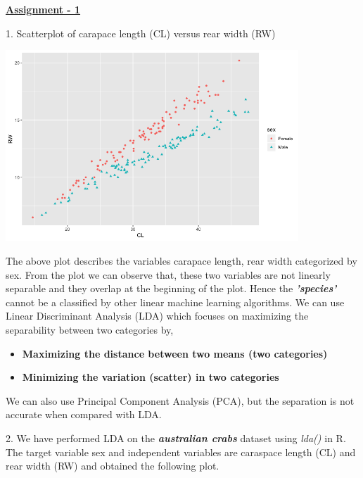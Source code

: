 \documentclass[a4paper,10pt]{article}
\begin{document}
\textbf{\underline{Assignment - 1}} \par
1. Scatterplot of carapace length (CL) versus rear width (RW) 
\begin{center}
	\includegraphics[width=110mm,scale=0.10]{CL_RW_Plot.png} 
\end{center} \par
The above plot describes the variables carapace length, rear width categorized by sex. From the plot we can observe
that, these two variables are not linearly separable and they overlap at the beginning of the plot.
Hence the \textit{\textbf{'species'}} cannot be a classified by other linear machine learning algorithms. We can use
Linear Discriminant Analysis (LDA) which focuses on maximizing the separability between two categories by, \par
\begin{center}
    \begin{itemize}
        \item \textbf{Maximizing the distance between two means (two categories)}
        \item \textbf{Minimizing the variation (scatter) in two categories}
    \end{itemize} \par
\end{center}
We can also use Principal Component Analysis (PCA), but the separation is not accurate when compared with LDA. \par
\vspace{0.5cm}
2. We have performed LDA on the \textit{\textbf{australian crabs}} dataset using \textit{lda()} in R. The target variable
sex and independent variables are caraspace length (CL) and rear width (RW) and obtained the following plot.
\end{document}
